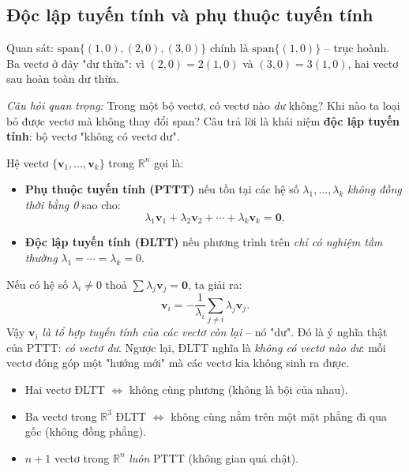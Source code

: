 \documentclass[12pt,a4paper]{article}
\begin{document}
\subsection{Độc lập tuyến tính và phụ thuộc tuyến tính}

\begin{dongco}
Quan sát: $\mathrm{span}\{(1,0),(2,0),(3,0)\}$ chính là $\mathrm{span}\{(1,0)\}$ -- trục hoành. Ba vectơ ở đây "dư thừa": vì $(2,0) = 2(1,0)$ và $(3,0) = 3(1,0)$, hai vectơ sau hoàn toàn dư thừa.

\emph{Câu hỏi quan trọng:} Trong một bộ vectơ, có vectơ nào \emph{dư} không? Khi nào ta loại bỏ được vectơ mà không thay đổi span? Câu trả lời là khái niệm \textbf{độc lập tuyến tính}: bộ vectơ "không có vectơ dư".
\end{dongco}

\begin{dinhnghia}
  Hệ vectơ $\{\mathbf{v}_1, \ldots, \mathbf{v}_k\}$ trong $\mathbb{R}^n$ gọi là:
  \begin{itemize}
    \item \textbf{Phụ thuộc tuyến tính (PTTT)} nếu tồn tại các hệ số $\lambda_1, \ldots, \lambda_k$ \emph{không đồng thời bằng 0} sao cho:
    \[
      \lambda_1 \mathbf{v}_1 + \lambda_2 \mathbf{v}_2 + \cdots + \lambda_k \mathbf{v}_k = \mathbf{0}.
    \]
    \item \textbf{Độc lập tuyến tính (ĐLTT)} nếu phương trình trên \emph{chỉ có nghiệm tầm thường} $\lambda_1 = \cdots = \lambda_k = 0$.
  \end{itemize}
\end{dinhnghia}

\begin{ynghia}[title={Tại sao định nghĩa lại có dạng bằng "0"?}]
Nếu có hệ số $\lambda_i \ne 0$ thoả $\sum \lambda_j \mathbf{v}_j = \mathbf{0}$, ta giải ra:
\[
  \mathbf{v}_i = -\dfrac{1}{\lambda_i}\sum_{j\ne i} \lambda_j \mathbf{v}_j.
\]
Vậy $\mathbf{v}_i$ \emph{là tổ hợp tuyến tính của các vectơ còn lại} -- nó "dư". Đó là ý nghĩa thật của PTTT: \emph{có vectơ dư}. Ngược lại, ĐLTT nghĩa là \emph{không có vectơ nào dư}: mỗi vectơ đóng góp một "hướng mới" mà các vectơ kia không sinh ra được.
\end{ynghia}

\begin{ynghia}[title={Hình ảnh hình học}]
\begin{itemize}
  \item Hai vectơ ĐLTT $\Leftrightarrow$ không cùng phương (không là bội của nhau).
  \item Ba vectơ trong $\mathbb{R}^3$ ĐLTT $\Leftrightarrow$ không cùng nằm trên một mặt phẳng đi qua gốc (không đồng phẳng).
  \item $n+1$ vectơ trong $\mathbb{R}^n$ \emph{luôn} PTTT (không gian quá chật).
\end{itemize}
\end{ynghia}
\end{document}
